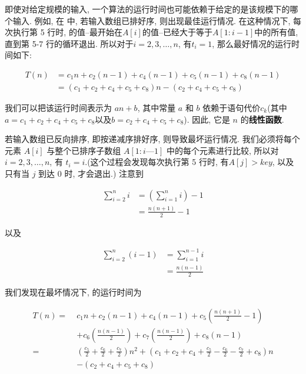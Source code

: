 \documentclass[oneside,10pt,fontset=none]{ctexbook}
\numberwithin{definition}{chapter}
\numberwithin{theorem}{chapter}
\numberwithin{proof}{chapter}
\begin{document}
即使对给定规模的输入, 一个算法的运行时间也可能依赖于给定的是该规模下的哪个输入. 例如, 在  中, 若输入数组已排好序, 则出现最佳运行情况. 在这种情况下, 每次执行第 5 行时, 的值--最开始在$A[i]$的值--已经大于等于$A[1:i-1]$中的所有值, 直到第 5-7 行的循环退出. 所以对于$i = 2,3,\dots,n$, 有$t_i=1$, 那么最好情况的运行时间如下:

\begin{equation}\begin{aligned}
T(n) &= c_1n + c_2(n-1) + c_4(n-1) + c_5(n-1) + c_8(n-1) \\
     &= (c_1+c_2+c_4+c_5+c_8)n - (c_2+c_4+c_5+c_8)
\end{aligned}\end{equation}

我们可以把该运行时间表示为 $an+b$, 其中常量 $a$ 和 $b$ 依赖于语句代价$c_k$(其中$a=c_1+c_2+c_4+c_5+c_8\text{以及}b=c_2+c_4+c_5+c_8$). 因此, 它是 $n$ 的\textbf{线性函数}.

若输入数组已反向排序, 即按递减序排好序, 则导致最坏运行情况. 我们必须将每个元素 $A[i]$ 与整个已排序子数组 $A[1:i—1]$ 中的每个元素进行比较, 所以对 $i=2,3,\dots,n$, 有 $t_i=i$.(这个过程会发现每次执行第 5 行时, 有$A[j]>key$, 以及只有当 $j$ 到达 0 时, 才会退出.) 注意到

\begin{equation*}\begin{split}
\sum_{i=2}^{n}i &= (\sum_{i=1}^{n}i) - 1 \\
                &= \frac{n(n+1)}{2} - 1
\end{split}\end{equation*}

以及

\begin{equation*}\begin{split}
\sum_{i=2}^{n}(i-1) &= \sum_{i=1}^{n-1}i \\
                    &= \frac{n(n-1)}{2}
\end{split}\end{equation*}

我们发现在最坏情况下,  的运行时间为

\begin{equation}\begin{aligned}
T(n) =\; &c_1n + c_2(n-1) + c_4(n-1) + c_5(\frac{n(n+1)}{2}-1) \\
&+c_6(\frac{n(n-1)}{2})+c_7(\frac{n(n-1)}{2})+c_8(n-1) \\
=\; &(\frac{c_5}{2}+\frac{c_6}{2}+\frac{c_7}{2})n^2 + (c_1+c_2+c_4+\frac{c_5}{2}-\frac{c_6}{2}-\frac{c_7}{2}+c_8)n \\
&-(c_2+c_4+c_5+c_8)
\end{aligned}\end{equation}
\end{document}
